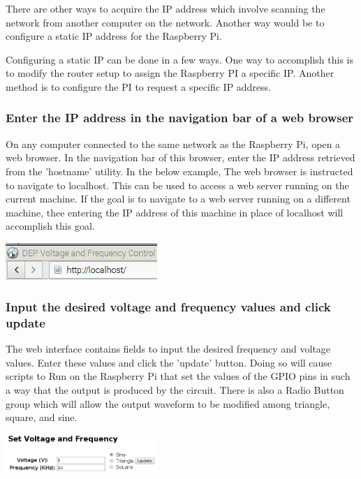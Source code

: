 \documentclass{article}	%
\begin{document}
\begin{multicols}{2}
There are other ways to acquire the IP address
which involve scanning the network from
another computer on the network.
Another way would be to configure a static IP address
for the Raspberry Pi.

Configuring a static IP can be done in a few ways.
One way to accomplish this is
to modify the router setup to assign the Raspberry PI a specific IP.
Another method is to configure the PI to request a specific IP address.

\subsubsection{Enter the IP address in the navigation bar of a web browser}
On any computer connected to the same network as the Raspberry Pi,
open a web browser.
In the navigation bar of this browser,
enter the IP address retrieved from the 'hostname' utility.
In the below example,
The web browser is instructed to navigate to localhost.
This can be used to access a web server running on the current machine.
If the goal is to navigate to a web server running on a different
machine, thee
entering the IP address of this machine in place of localhost will
accomplish this goal.

\begin{center}
\includegraphics[width=0.43\textwidth,keepaspectratio]{localhost_navigation.png}
\end{center}

\subsubsection{Input the desired voltage and frequency values and click update}
The web interface contains fields to input the desired frequency and voltage values.
Enter these values and click the 'update' button.
Doing so will cause scripts to Run on the Raspberry Pi that
set the values of the GPIO pins in such a way that the output is produced
by the circuit.
There is also a Radio Button group which will allow the 
output waveform to be modified among triangle, square, and sine.

\begin{center}
\includegraphics[width=0.43\textwidth,keepaspectratio]{web_interface_updating_values.png}
\end{center}


\end{multicols}
\end{document}
